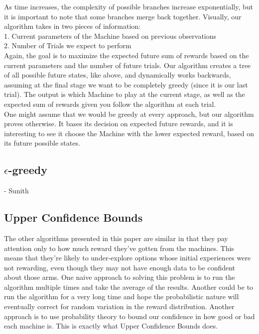 \documentclass{article}
\begin{document}
As time increases, the complexity of possible branches increase exponentially, but it is important to note that some branches merge back together. Visually, our algorithm takes in two pieces of information:\\

1. Current parameters of the Machine based on previous observations\\
2. Number of Trials we expect to perform\\

Again, the goal is to maximize the expected future sum of rewards based on the current parameters and the number of future trials. Our algorithm creates a tree of all possible future states, like above, and dynamically works backwards, assuming at the final stage we want to be completely greedy (since it is our last trial). The output is which Machine to play at the current stage, as well as the expected sum of rewards given you follow the algorithm at each trial.\\


One might assume that we would be greedy at every approach, but our algorithm proves otherwise. It bases its decision on expected future rewards, and it is interesting to see it choose the Machine with the lower expected reward, based on its future possible states.

\subsection{$\epsilon$-greedy}

- Sunith

\subsection{Upper Confidence Bounds}

The other algorithms presented in this paper are similar in that they pay attention only to how much reward they’ve gotten from the machines. This means that they're likely to under-explore options whose initial experiences were not rewarding, even though they may not have enough data to be confident about those arms. One naive approach to solving this problem is to run the algorithm multiple times and take the average of the results. Another could be to run the algorithm for a very long time and hope the probabilistic nature will eventually correct for random variation in the reward distribution. Another approach is to use probability theory to bound our confidence in how good or bad each machine is. This is exactly what Upper Confidence Bounds does.\\
\end{document}
